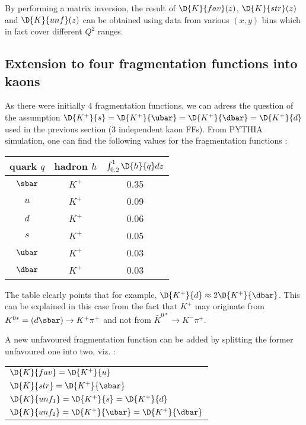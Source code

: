 By performing a matrix inversion, the result of $\D{K}{fav}(z)$, $\D{K}{str}(z)$ and $\D{K}{unf}(z)$ can be obtained using data from various $(x,y)$ bins which in fact cover different $Q^2$ ranges.

\subsection{Extension to four fragmentation functions into kaons}

As there were initially 4 fragmentation functions, we can adress the question of the assumption
$\D{K^+}{s}=\D{K^+}{\ubar}=\D{K^+}{\dbar}=\D{K^+}{d}$ used in the previous section (3 independent kaon FFs). From PYTHIA simulation, one can find the following
values for the fragmentation functions :

\begin{center}
  \begin{tabular}{ || c | c | c || }
    \hline \hline
    quark $q$ & hadron $h$ & $\int_{0.2}^{1}\D{h}{q}dz$ \\ \hline
    $\sbar$ & $K^+$ & 0.35 \\
    $u$ & $K^+$ & 0.09 \\
    $d$ & $K^+$ & 0.06 \\
    $s$ & $K^+$ & 0.05 \\
    $\ubar$ & $K^+$ & 0.03 \\
    $\dbar$ & $K^+$ & 0.03 \\
    \hline \hline
  \end{tabular}
\end{center}

The table clearly points that for example, $\D{K^+}{d} \approx 2\D{K^+}{\dbar}$. This can be explained
in this case from the fact that $K^+$ may originate from $K^{0*} = (d\sbar) \rightarrow K^+\pi^+$ and
not from $\bar{K}^{0*} \rightarrow K^-\pi^+$.

A new unfavoured fragmentation function can be added by splitting the former unfavoured one into two, viz. :

\begin{center}
  \begin{tabular}{ l }
    $\D{K}{fav}=\D{K^+}{u}$ \\
    $\D{K}{str}=\D{K^+}{\sbar}$ \\
    $\D{K}{unf_1}=\D{K^+}{s}=\D{K^+}{d}$ \\
    $\D{K}{unf_2}=\D{K^+}{\ubar}=\D{K^+}{\dbar}$ \\
  \end{tabular}
\end{center}

